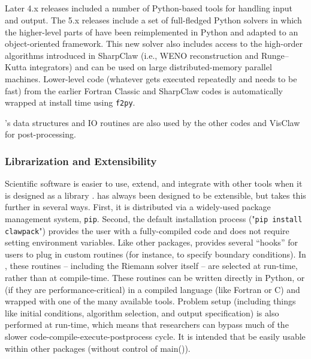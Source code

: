 %
%
%

\subsection{\pyclaw} \label{sec:pyclaw}

Later 4.x releases included a number of Python-based tools for handling
\clawpack input and output.  The 5.x releases include a set of full-fledged Python
solvers in which the higher-level parts of \clawpack have been reimplemented in
Python and adapted to an object-oriented framework.  This new solver also
includes access to the high-order algorithms introduced in SharpClaw (i.e.,
WENO reconstruction and Runge--Kutta integrators) and can be used on large
distributed-memory parallel machines.  Lower-level code (whatever gets executed
repeatedly and needs to be fast) from the earlier Fortran Classic and SharpClaw
codes is automatically wrapped at install time using \texttt{f2py}.

\pyclaw's data structures and IO routines are also used by the other \clawpack
codes and VisClaw for post-processing.

\subsubsection{Librarization and Extensibility}
Scientific software is easier to use, extend, and integrate with other tools when
it is designed as a library \cite{Brown:2015cj}.  \clawpack has always been designed
to be extensible, but \pyclaw takes this further in several ways.  First, it is
distributed via a widely-used package management system, \texttt{pip}.
Second, the default installation process ("\texttt{pip install clawpack}")
provides the user with a fully-compiled code and does not require setting environment
variables.  Like other \clawpack packages, \pyclaw provides several ``hooks'' for users
to plug in custom routines (for instance, to specify boundary conditions).
In \pyclaw, these routines -- including the Riemann solver itself -- are selected at
run-time, rather than at compile-time.  These routines can be written directly in
Python, or (if they are performance-critical) in a compiled language (like Fortran or C)
and wrapped with one of the many available tools.  Problem setup (including things like
initial conditions, algorithm selection, and output specification) is also
performed at run-time, which means that researchers can bypass much of the slower
code-compile-execute-postprocess cycle.
It is intended that \pyclaw be easily usable within other packages (without control of main()).

